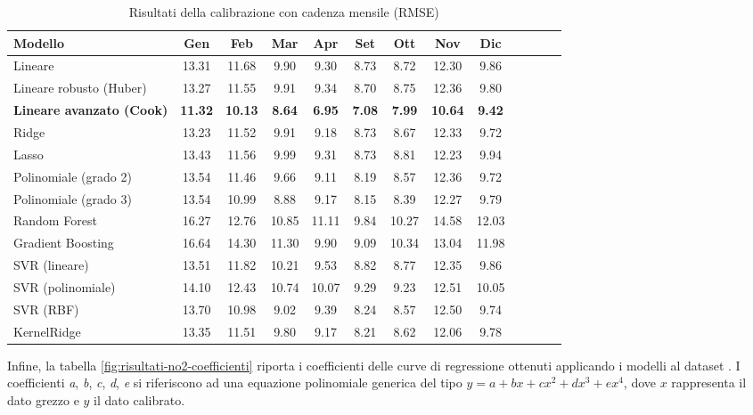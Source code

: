 \begin{table}[H]
    \footnotesize
    \centering
    \def\arraystretch{0.95}
    \setlength{\tabcolsep}{5pt}
    \begin{tabular}{|l|c|c|c|c|c|c|c|c|c|c|c|c|}
    \hline
        \textbf{Modello} & \textbf{Gen} & \textbf{Feb} & \textbf{Mar} & \textbf{Apr} & \textbf{Set} & \textbf{Ott} & \textbf{Nov} & \textbf{Dic} \\ \hline
        Lineare & 13.31 & 11.68 & 9.90 & 9.30 & 8.73 & 8.72 & 12.30 & 9.86 \\ \hline
        Lineare robusto (Huber) & 13.27 & 11.55 & 9.91 & 9.34 & 8.70 & 8.75 & 12.36 & 9.80 \\ \hline
        \textbf{Lineare avanzato (Cook)} & \textbf{11.32} & \textbf{10.13} & \textbf{8.64} & \textbf{6.95} & \textbf{7.08} & \textbf{7.99} & \textbf{10.64} & \textbf{9.42} \\ \hline
        Ridge & 13.23 & 11.52 & 9.91 & 9.18 & 8.73 & 8.67 & 12.33 & 9.72 \\ \hline
        Lasso & 13.43 & 11.56 & 9.99 & 9.31 & 8.73 & 8.81 & 12.23 & 9.94 \\ \hline
        Polinomiale (grado 2) & 13.54 & 11.46 & 9.66 & 9.11 & 8.19 & 8.57 & 12.36 & 9.72 \\ \hline
        Polinomiale (grado 3) & 13.54 & 10.99 & 8.88 & 9.17 & 8.15 & 8.39 & 12.27 & 9.79 \\ \hline
        Random Forest & 16.27 & 12.76 & 10.85 & 11.11 & 9.84 & 10.27 & 14.58 & 12.03 \\ \hline
        Gradient Boosting & 16.64 & 14.30 & 11.30 & 9.90 & 9.09 & 10.34 & 13.04 & 11.98 \\ \hline
        SVR (lineare) & 13.51 & 11.82 & 10.21 & 9.53 & 8.82 & 8.77 & 12.35 & 9.86 \\ \hline
        SVR (polinomiale) & 14.10 & 12.43 & 10.74 & 10.07 & 9.29 & 9.23 & 12.51 & 10.05 \\ \hline
        SVR (RBF) & 13.70 & 10.98 & 9.02 & 9.39 & 8.24 & 8.57 & 12.50 & 9.74 \\ \hline
        KernelRidge & 13.35 & 11.51 & 9.80 & 9.17 & 8.21 & 8.62 & 12.06 & 9.78 \\ \hline
    \end{tabular}
    \captionsetup{justification=centering}
    \caption{Risultati della calibrazione  con cadenza mensile (RMSE)}
    \label{fig:risultati-no2-rmse-mese}
\end{table}

Infine, la tabella \ref{fig:risultati-no2-coefficienti} riporta i coefficienti delle curve di regressione ottenuti applicando i modelli al dataset . I coefficienti \textit{a}, \textit{b}, \textit{c}, \textit{d}, \textit{e} si riferiscono ad una equazione polinomiale generica del tipo $y=a+bx+cx^2+dx^3+ex^4$, dove $x$ rappresenta il dato grezzo e $y$ il dato calibrato.

